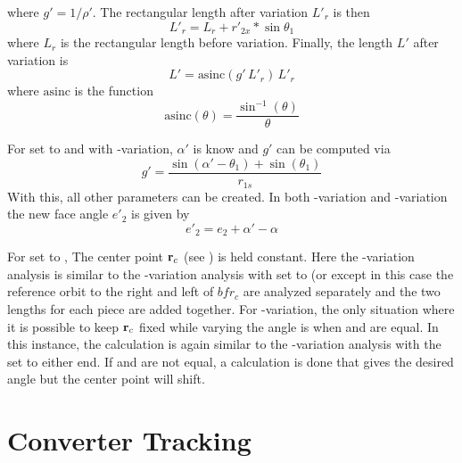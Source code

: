 where $g' = 1 / \rho'$.
The rectangular length after variation $L'_r$ is then
\begin{equation}
  L'_r = L_r + r'_{2x} * \sin\theta_1
\end{equation}
where $L_r$ is the rectangular length before variation.
Finally, the length $L'$ after variation is
\begin{equation}
  L' = \text{asinc} \left( g' \, L'_r \right) \, L'_r
\end{equation}
where $\text{asinc}$ is the function
\begin{equation}
  \text{asinc}(\theta) = \frac{\sin^{-1}(\theta)}{\theta}
\end{equation}

For  set to  and with -variation, $\alpha'$ is know and
$g'$ can be computed via
\begin{equation}
  g' = \frac{\sin(\alpha' - \theta_1) + \sin(\theta_1)}{r_{1s}}
  \label{gatt}
\end{equation}
With this, all other parameters can be created. In both -variation and -variation the new
face angle $e'_2$ is given by
\begin{equation}
  e'_2 = e_2 + \alpha' - \alpha
\end{equation}

For  set to , The center point ${\bf r}_c$ (see ) is held
constant.  Here the -variation analysis is similar to the -variation analysis with
 set to  (or  except in this case the reference orbit
to the right and left of $bfr_c$ are analyzed separately and the two lengths for each piece are
added together. For -variation, the only situation where it is possible to keep ${\bf r}_c$
fixed while varying the angle is when  and  are equal. In this instance, the
calculation is again similar to the -variation analysis with the  set to
either end. If  and  are not equal, a calculation is done that gives the desired angle
but the center point will shift.

\section{Converter Tracking}
\label{s:converter.track}

